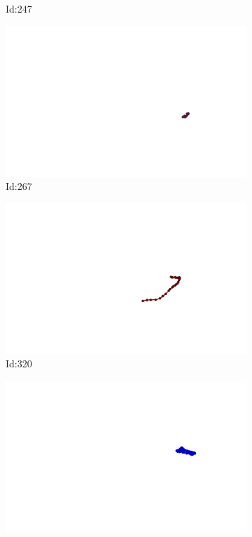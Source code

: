\documentclass[12pt,twoside]{report}
\begin{document}
\begin{figure}
\begin{subfigure}[b]{0.20\textwidth}
\caption{Id:247}
\end{subfigure}
\begin{subfigure}[b]{0.20\textwidth}
\centering
\includegraphics[width=\textwidth]{../trajectories/267.png}
\caption{Id:267}
\end{subfigure}
\begin{subfigure}[b]{0.20\textwidth}
\centering
\includegraphics[width=\textwidth]{../trajectories/320.png}
\caption{Id:320}
\end{subfigure}
\begin{subfigure}[b]{0.20\textwidth}
\centering
\includegraphics[width=\textwidth]{../trajectories/368.png}

\end{subfigure}
\end{figure}
\end{document}
